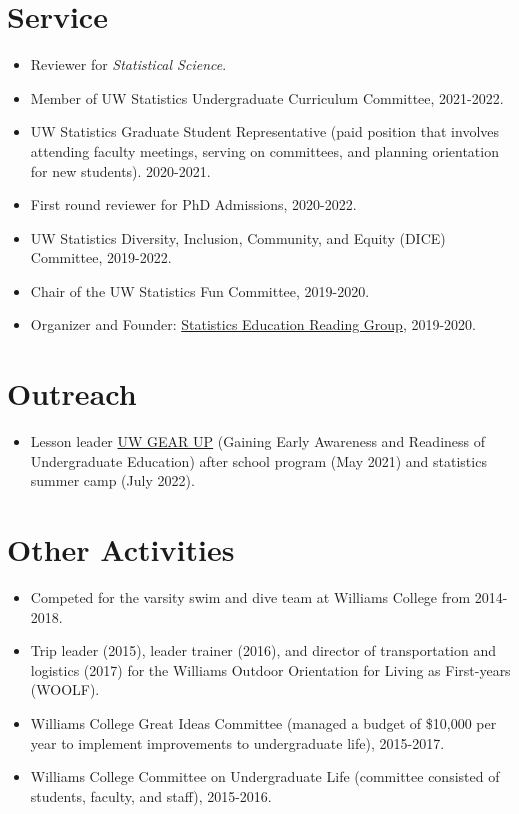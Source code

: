 \documentclass[margin, 10pt]{res} %
\begin{document}
\begin{resume}
{\section{Service}
\begin{itemize}
\item Reviewer for \textit{Statistical Science}.
\item Member of UW Statistics Undergraduate Curriculum Committee, 2021-2022. 
 \item UW Statistics Graduate Student Representative (paid position that involves attending faculty meetings, serving on committees, and planning orientation for new students). 2020-2021.
    \item First round reviewer for PhD Admissions, 2020-2022. 
    \item UW Statistics Diversity, Inclusion, Community, and Equity (DICE) Committee, 2019-2022.   
    \item Chair of the UW Statistics Fun Committee, 2019-2020.
    \item Organizer and Founder: \href{https://pearce790.github.io}{Statistics Education Reading Group}, 2019-2020.
 \end{itemize}
 
 
 \section{Outreach}
 \begin{itemize}
    \item Lesson leader \href{https://depts.washington.edu/gearupac/}{UW GEAR UP} (Gaining Early Awareness and Readiness of Undergraduate Education) after school program (May 2021) and statistics summer camp (July 2022). 
   \end{itemize}
   
 \section{Other Activities}
\begin{itemize}
\item Competed for the varsity swim and dive team at Williams College from 2014-2018. %
\item Trip leader (2015), leader trainer (2016), and director of transportation and logistics (2017) for the Williams Outdoor Orientation for Living as First-years (WOOLF). 
  \item Williams College Great Ideas Committee (managed a budget of \$10,000 per year to implement improvements to undergraduate life), 2015-2017.
 \item Williams College Committee on Undergraduate Life (committee consisted of students, faculty, and staff), 2015-2016.


\end{itemize}}
\end{resume}
\end{document}

